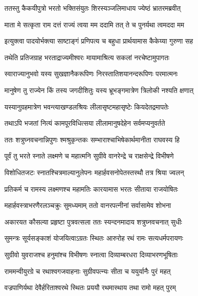 

\twolineshloka
{ततस्तु कैकयीपुत्रो भरतो भक्तिसंयुतः}
{शिरस्यञ्जलिमाधाय ज्येष्ठं भ्रातरमब्रवीत्} %

\twolineshloka
{माता मे सत्कृता राम दत्तं राज्यं त्वया मम}
{ददामि तत् ते च पुनर्यथा त्वमददा मम} %

\twolineshloka
{इत्युक्त्वा पादयोर्भक्त्या साष्टाङ्गं प्रणिपत्य च}
{बहुधा प्रार्थयामास कैकेय्या गुरुणा सह} %

\twolineshloka
{तथेति प्रतिजग्राह भरताद्राज्यमीश्वरः}
{मायामाश्रित्य सकलां नरचेष्टामुपागतः} %

\twolineshloka
{स्वाराज्यानुभवो यस्य सुखज्ञानैकरूपिणः}
{निरस्तातिशयानन्दरूपिणः परमात्मनः} %

\twolineshloka
{मानुषेण तु राज्येन किं तस्य जगदीशितुः}
{यस्य भ्रूभङ्गमात्रेण त्रिलोकी नश्यति क्षणात्} %

\twolineshloka
{यस्यानुग्रहमात्रेण भवन्त्याखण्डलश्रियः}
{लीलासृष्टमहासृष्टेः कियदेतद्रमापतेः} %

\twolineshloka
{तथाऽपि भजतां नित्यं कामपूरविधित्सया}
{लीलामानुषदेहेन सर्वमप्यनुवर्तते} %

\twolineshloka
{ततः शत्रुघ्नवचनान्निपुणः श्मश्रुकृन्तकः}
{सम्भाराश्चाभिषेकार्थमानीता राघवस्य हि} %

\twolineshloka
{पूर्वं तु भरते स्नाते लक्ष्मणे च महात्मनि}
{सुग्रीवे वानरेन्द्रे च राक्षसेन्द्रे विभीषणे} %

\twolineshloka
{विशोधितजटः स्नातश्चित्रमाल्यानुलेपनः}
{महार्हवसनोपेतस्तस्थौ तत्र श्रिया ज्वलन्} %

\twolineshloka
{प्रतिकर्म च रामस्य लक्ष्मणश्च महामतिः}
{कारयामास भरतः सीताया राजयोषितः} %

\twolineshloka
{महार्हवस्त्राभरणैरलञ्चक्रुः सुमध्यमाम्}
{ततो वानरपत्नीनां सर्वासामेव शोभना} %

\twolineshloka
{अकारयत कौसल्या प्रहृष्टा पुत्रवत्सला}
{ततः स्यन्दनमादाय शत्रुघ्नवचनात् सुधीः} %

\twolineshloka
{सुमन्त्रः सूर्यसङ्काशं योजयित्वाऽग्रतः स्थितः}
{आरुरोह रथं रामः सत्यधर्मपरायणः} %

\twolineshloka
{सुग्रीवो युवराजश्च हनुमांश्च विभीषणः}
{स्नात्वा दिव्याम्बरधरा दिव्याभरणभूषिताः} %

\twolineshloka
{राममन्वीयुरग्रे च रथाश्वगजवाहनाः}
{सुग्रीवपत्न्यः सीता च ययुर्यानैः पुरं महत्} %

\twolineshloka
{वज्रपाणिर्यथा देवैर्हरिताश्वरथे स्थितः}
{प्रययौ रथमास्थाय तथा रामो महत् पुरम्} %

